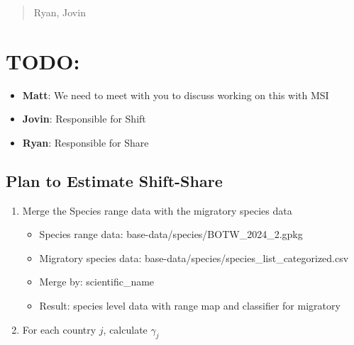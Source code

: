 \documentclass[
  letterpaper,
]{article}
\providecommand{\tightlist}{%
  \setlength{\itemsep}{0pt}\setlength{\parskip}{0pt}}\usepackage{longtable,booktabs,array}
\begin{document}
\begin{tcolorbox}[enhanced jigsaw, toptitle=1mm, toprule=.15mm, bottomrule=.15mm, leftrule=.75mm, opacityback=0, colframe=quarto-callout-note-color-frame, coltitle=black, left=2mm, rightrule=.15mm, titlerule=0mm, breakable, colback=white, bottomtitle=1mm, title=\textcolor{quarto-callout-note-color}{\faInfo}\hspace{0.5em}{8/27/2025}, opacitybacktitle=0.6, colbacktitle=quarto-callout-note-color!10!white, arc=.35mm]

\begin{quote}
Ryan, Jovin
\end{quote}

\section{TODO:}\label{todo-1}

\begin{itemize}
\tightlist
\item
  \textbf{Matt}: We need to meet with you to discuss working on this
  with MSI
\item
  \textbf{Jovin}: Responsible for Shift
\item
  \textbf{Ryan}: Responsible for Share
\end{itemize}

\subsection{Plan to Estimate
Shift-Share}\label{plan-to-estimate-shift-share}

\begin{enumerate}
\def\labelenumi{\arabic{enumi}.}
\tightlist
\item
  Merge the Species range data with the migratory species data

  \begin{itemize}
  \tightlist
  \item
    Species range data: base-data/species/BOTW\_2024\_2.gpkg
  \item
    Migratory species data:
    base-data/species/species\_list\_categorized.csv
  \item
    Merge by: scientific\_name
  \item
    Result: species level data with range map and classifier for
    migratory
  \end{itemize}
\item
  For each country \(j\), calculate \(\gamma_j\)
\end{enumerate}


\end{tcolorbox}
\end{document}
